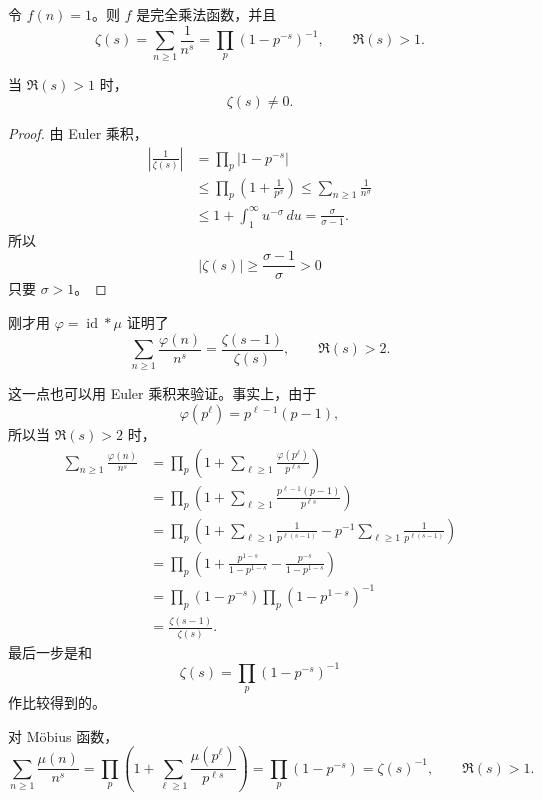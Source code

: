 \begin{example}
	令 $f(n)=1$。则 $f$ 是完全乘法函数，并且
	\[
		\zeta(s)
		=
		\sum_{n\geq 1}\frac1{n^s}
		=
		\prod_p(1-p^{-s})^{-1},
		\qquad \Re(s)>1.
	\]
\end{example}

\begin{corollary}[原文 Corollary 4.8]
	当 $\Re(s)>1$ 时，
	\[
		\zeta(s)\neq 0.
	\]
\end{corollary}

\begin{proof}
	由 Euler 乘积，
	\[
	\begin{aligned}
		\left|\frac1{\zeta(s)}\right|
		&=
		\prod_p|1-p^{-s}|\\
		&\leq
		\prod_p\left(1+\frac1{p^\sigma}\right)
		\leq
		\sum_{n\geq 1}\frac1{n^\sigma}\\
		&\leq
		1+\int_1^\infty u^{-\sigma}\,du
		=
		\frac{\sigma}{\sigma-1}.
	\end{aligned}
	\]
	所以
	\[
		|\zeta(s)|\geq\frac{\sigma-1}{\sigma}>0
	\]
	只要 $\sigma>1$。
\end{proof}

\begin{example}
	刚才用 $\varphi=\operatorname{id}*\mu$ 证明了
	\[
		\sum_{n\geq 1}\frac{\varphi(n)}{n^s}
		=
		\frac{\zeta(s-1)}{\zeta(s)},
		\qquad \Re(s)>2.
	\]
\end{example}


这一点也可以用 Euler 乘积来验证。事实上，由于
\[
	\varphi(p^\ell)=p^{\ell-1}(p-1),
\]
所以当 $\Re(s)>2$ 时，
\[
\begin{aligned}
	\sum_{n\geq 1}\frac{\varphi(n)}{n^s}
	&=
	\prod_p\left(1+\sum_{\ell\geq 1}
	\frac{\varphi(p^\ell)}{p^{\ell s}}\right)\\
	&=
	\prod_p\left(1+\sum_{\ell\geq 1}
	\frac{p^{\ell-1}(p-1)}{p^{\ell s}}\right)\\
	&=
	\prod_p\left(1+\sum_{\ell\geq 1}
	\frac1{p^{\ell(s-1)}}-
	p^{-1}\sum_{\ell\geq 1}\frac1{p^{\ell(s-1)}}\right)\\
	&=
	\prod_p\left(1+\frac{p^{1-s}}{1-p^{1-s}}
	-\frac{p^{-s}}{1-p^{1-s}}\right)\\
	&=
	\prod_p(1-p^{-s})\prod_p(1-p^{1-s})^{-1}\\
	&=
	\frac{\zeta(s-1)}{\zeta(s)}.
\end{aligned}
\]
最后一步是和
\[
	\zeta(s)=\prod_p(1-p^{-s})^{-1}
\]
作比较得到的。

\begin{example}
	对 Möbius 函数，
	\[
		\sum_{n\geq 1}\frac{\mu(n)}{n^s}
		=
		\prod_p\left(1+\sum_{\ell\geq 1}
		\frac{\mu(p^\ell)}{p^{\ell s}}\right)
		=
		\prod_p(1-p^{-s})
		=
		\zeta(s)^{-1},
		\qquad \Re(s)>1.
	\]
\end{example}

